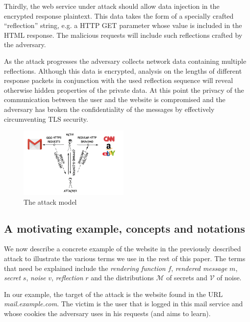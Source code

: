 Thirdly, the web service under attack should allow data injection in the
encrypted response plaintext. This data takes the form of a specially crafted
``reflection'' string, e.g. a HTTP GET parameter whose value is included
in the HTML response. The malicious requests will include such reflections
crafted by the adversary.

As the attack progresses the adversary collects network data containing multiple
reflections. Although this data is encrypted, analysis on the lengths of
different response packets in conjunction with the used reflection sequence will
reveal otherwise hidden properties of the private data. At this point the
privacy of the communication between the user and the website is compromised and
the adversary has broken the confidentiality of the messages by effectively
circumventing TLS security.

    \begin{figure}[thpb]
        \centering
            \includegraphics[width=0.48\textwidth]{figures/attack_model.png}
        \caption{The attack model}
        \label{fig:attack_model}
    \end{figure}

\subsection{A motivating example, concepts and notations}\label{subsec:terms}
We now describe a concrete example of the website in the previously described
attack to illustrate the various terms we use in the rest of this paper. The
terms that need be explained include the \textit{rendering function} $f$,
\textit{rendered message} $m$, \textit{secret} $s$, \textit{noise} $v$,
\textit{reflection} $r$ and the distributions $\mathcal{M}$ of secrets and
$\mathcal{V}$ of noise.

In our example, the target of the attack is the website found in the URL
\textit{mail.example.com}. The victim is the user that is logged in this mail
service and whose cookies the adversary uses in his requests (and aims to
learn).

